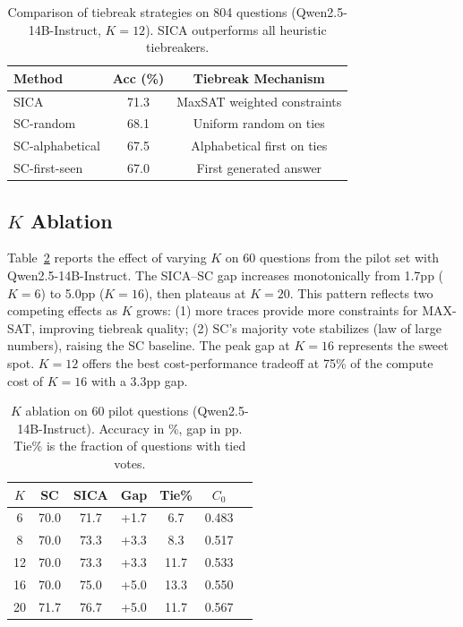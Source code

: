 \documentclass[11pt,a4paper]{article}
\begin{document}
\begin{table}[t]
\centering
\small
\begin{tabular}{lcc}
\toprule
\textbf{Method} & \textbf{Acc (\%)} & \textbf{Tiebreak Mechanism} \\
\midrule
SICA             & 71.3 & MaxSAT weighted constraints \\
SC-random        & 68.1 & Uniform random on ties \\
SC-alphabetical  & 67.5 & Alphabetical first on ties \\
SC-first-seen    & 67.0 & First generated answer \\
\bottomrule
\end{tabular}
\caption{Comparison of tiebreak strategies on 804 questions (Qwen2.5-14B-Instruct, $K=12$). SICA outperforms all heuristic tiebreakers.}
\label{tab:tiebreak_baseline}
\end{table}


\subsection{$K$ Ablation}
\label{sec:k_ablation}

Table~\ref{tab:k_ablation} reports the effect of varying $K$ on 60 questions from the pilot set with Qwen2.5-14B-Instruct.
The SICA--SC gap increases monotonically from 1.7pp ($K = 6$) to 5.0pp ($K = 16$), then plateaus at $K = 20$.
This pattern reflects two competing effects as $K$ grows: (1) more traces provide more constraints for MAX-SAT, improving tiebreak quality; (2) SC's majority vote stabilizes (law of large numbers), raising the SC baseline.
The peak gap at $K = 16$ represents the sweet spot.
$K = 12$ offers the best cost-performance tradeoff at 75\% of the compute cost of $K = 16$ with a 3.3pp gap.

\begin{table}[t]
\centering
\small
\begin{tabular}{ccccccc}
\toprule
$K$ & \textbf{SC} & \textbf{SICA} & \textbf{Gap} & \textbf{Tie\%} & $C_0$ \\
\midrule
6  & 70.0 & 71.7 & +1.7 & 6.7  & 0.483 \\
8  & 70.0 & 73.3 & +3.3 & 8.3  & 0.517 \\
12 & 70.0 & 73.3 & +3.3 & 11.7 & 0.533 \\
16 & 70.0 & 75.0 & +5.0 & 13.3 & 0.550 \\
20 & 71.7 & 76.7 & +5.0 & 11.7 & 0.567 \\
\bottomrule
\end{tabular}
\caption{$K$ ablation on 60 pilot questions (Qwen2.5-14B-Instruct). Accuracy in \%, gap in pp. Tie\% is the fraction of questions with tied votes.}
\label{tab:k_ablation}
\end{table}
\end{document}
